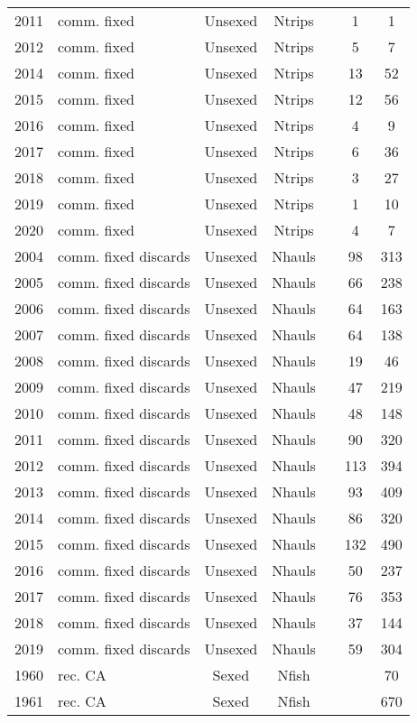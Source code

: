 \begin{longtable}[t]{c>{\centering\arraybackslash}p{3cm}ccccc}
2011 & comm. fixed & Unsexed & Ntrips &  & 1 & 1\\
2012 & comm. fixed & Unsexed & Ntrips &  & 5 & 7\\
2014 & comm. fixed & Unsexed & Ntrips &  & 13 & 52\\
2015 & comm. fixed & Unsexed & Ntrips &  & 12 & 56\\
2016 & comm. fixed & Unsexed & Ntrips &  & 4 & 9\\
2017 & comm. fixed & Unsexed & Ntrips &  & 6 & 36\\
2018 & comm. fixed & Unsexed & Ntrips &  & 3 & 27\\
2019 & comm. fixed & Unsexed & Ntrips &  & 1 & 10\\
2020 & comm. fixed & Unsexed & Ntrips &  & 4 & 7\\
2004 & comm. fixed discards & Unsexed & Nhauls &  & 98 & 313\\
2005 & comm. fixed discards & Unsexed & Nhauls &  & 66 & 238\\
2006 & comm. fixed discards & Unsexed & Nhauls &  & 64 & 163\\
2007 & comm. fixed discards & Unsexed & Nhauls &  & 64 & 138\\
2008 & comm. fixed discards & Unsexed & Nhauls &  & 19 & 46\\
2009 & comm. fixed discards & Unsexed & Nhauls &  & 47 & 219\\
2010 & comm. fixed discards & Unsexed & Nhauls &  & 48 & 148\\
2011 & comm. fixed discards & Unsexed & Nhauls &  & 90 & 320\\
2012 & comm. fixed discards & Unsexed & Nhauls &  & 113 & 394\\
2013 & comm. fixed discards & Unsexed & Nhauls &  & 93 & 409\\
2014 & comm. fixed discards & Unsexed & Nhauls &  & 86 & 320\\
2015 & comm. fixed discards & Unsexed & Nhauls &  & 132 & 490\\
2016 & comm. fixed discards & Unsexed & Nhauls &  & 50 & 237\\
2017 & comm. fixed discards & Unsexed & Nhauls &  & 76 & 353\\
2018 & comm. fixed discards & Unsexed & Nhauls &  & 37 & 144\\
2019 & comm. fixed discards & Unsexed & Nhauls &  & 59 & 304\\
1960 & rec. CA & Sexed & Nfish &  &  & 70\\
1961 & rec. CA & Sexed & Nfish &  &  & 670\\

\end{longtable}
